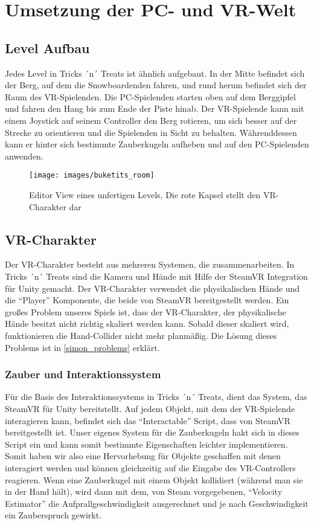 \chapter{Umsetzung der PC- und VR-Welt}
\section{Level Aufbau}
Jedes Level in Tricks ´n´ Treats ist ähnlich aufgebaut. 
In der Mitte befindet sich der Berg, auf dem die Snowboardenden fahren, und rund herum befindet sich der Raum des VR-Spielenden. Die PC-Spielenden starten oben auf dem Berggipfel und fahren den Hang bis zum Ende der Piste hinab. Der VR-Spielende kann mit einem Joystick auf seinem Controller den Berg rotieren, um sich besser auf der Strecke zu orientieren und die Spielenden in Sicht zu behalten. Währenddessen kann er hinter sich bestimmte Zauberkugeln aufheben und auf den PC-Spielenden anwenden.


\begin{figure}[H]
	\centering
	\texttt{[image: images/buketits\_room]}
	\caption{Editor View eines unfertigen Levels, Die rote Kapsel stellt den VR-Charakter dar}
\end{figure}

\section{VR-Charakter} \label{simon_vrspieler}
Der VR-Charakter besteht aus mehreren Systemen, die zusammenarbeiten. In Tricks ´n´ Treats sind die Kamera und Hände mit Hilfe der SteamVR Integration für Unity gemacht. Der VR-Charakter verwendet die physikalischen Hände und die "`Player"' Komponente, die beide von SteamVR bereitgestellt werden. Ein großes Problem unseres Spiels ist, dass der VR-Charakter, der physikalische Hände besitzt nicht richtig skaliert werden kann. Sobald dieser skaliert wird, funktionieren die Hand-Collider nicht mehr planmäßig. Die Lösung dieses Problems ist in \ref{simon_problems} erklärt.

\subsection{Zauber und Interaktionssystem}
Für die Basis des Interaktionssystems in Tricks ´n´ Treats, dient das System, das SteamVR für Unity bereitstellt. Auf jedem Objekt, mit dem der VR-Spielende interagieren kann, befindet sich das "`Interactable"' Script, dass von SteamVR bereitgestellt ist. Unser eigenes System für die Zauberkugeln hakt sich in dieses Script ein und kann somit bestimmte Eigenschaften leichter implementieren. Somit haben wir also eine Hervorhebung für Objekte geschaffen mit denen interagiert werden und können gleichzeitig auf die Eingabe des VR-Controllers reagieren. Wenn eine Zauberkugel mit einem Objekt kollidiert (während man sie in der Hand hält), wird dann mit dem, von Steam vorgegebenen, "`Velocity Estimator"' die Aufprallgeschwindigkeit ausgerechnet und je nach Geschwindigkeit ein Zauberspruch gewirkt.

